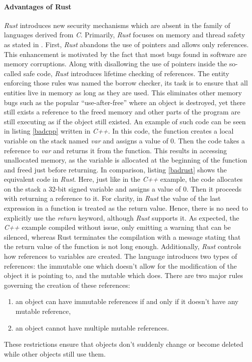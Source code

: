 \paragraph{Advantages of Rust}
\textit{Rust} introduces new security mechanisms which are absent in the family of languages derived from \textit{C}. Primarily, \textit{Rust} focuses on memory and thread safety as stated in \cite{rustmemorysafety}. First, \textit{Rust} abandons the use of pointers and allows only references. This enhancement is motivated by the fact that most bugs found in software are memory corruptions. Along with disallowing the use of pointers inside the so-called safe code, \textit{Rust} introduces lifetime checking of references. The entity enforcing those rules was named the borrow checker, its task is to ensure that all entities live in memory as long as they are used. This eliminates other memory bugs such as the popular “use-after-free” where an object is destroyed, yet there still exists a reference to the freed memory and other parts of the program are still executing as if the object still existed. An example of such code can be seen in listing \ref{badcpp} written in \textit{C++}. In this code, the function creates a local variable on the stack named \textit{var} and assigns a value of 0. Then the code takes a reference to \textit{var} and returns it from the function. This results in accessing unallocated memory, as the variable is allocated at the beginning of the function and freed just before returning. In comparison, listing \ref{badrust} shows the equivalent code in \textit{Rust}. Here, just like in the \textit{C++} example, the code allocates on the stack a 32-bit signed variable and assigns a value of $0$. Then it proceeds with returning a reference to it. For clarity, in \textit{Rust} the value of the last expression in a function is treated as the return value. Hence, there is no need to explicitly use the \textit{return} keyword, although \textit{Rust} supports it. As expected, the \textit{C++} example compiled without issue, only emitting a warning that can be silenced, whereas Rust terminates the compilation with a message stating that the return value of the function is not long enough. Additionally, \textit{Rust} controls how references to variables are created. The language introduces two types of references: the immutable one which doesn't allow for the modification of the object it is pointing to, and the mutable which does. There are two major rules governing the creation of these references:
\begin{enumerate}
    \item an object can have immutable references if and only if it doesn't have any mutable reference,
    \item an object cannot have multiple mutable references.
\end{enumerate}
These restrictions ensure that objects don't suddenly change or become deleted while other objects still use them.

